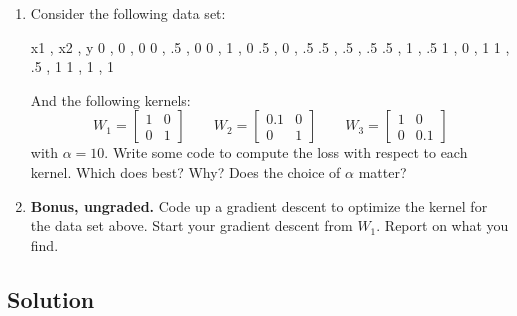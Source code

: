 \documentclass[submit]{harvardml}
\begin{document}
\begin{problem}
\begin{enumerate}
\item Consider the following data set:
\begin{csv}
x1 , x2 , y 
  0 , 0 , 0
  0 , .5 , 0
  0 , 1 , 0 
  .5 , 0 , .5
  .5 , .5 , .5
  .5 , 1 , .5
  1 , 0 , 1
  1 , .5 , 1
  1 , 1 , 1 
\end{csv}
And the following kernels:
\begin{equation*} 
W_1 = \begin{bmatrix}
  1 & 0 \\
  0 & 1 
\end{bmatrix}
\qquad
W_2 = \begin{bmatrix}
  0.1 & 0 \\
  0 & 1 
\end{bmatrix}
\qquad
W_3 = \begin{bmatrix}
  1 & 0 \\
  0 & 0.1 
\end{bmatrix}
\end{equation*} 
with $\alpha = 10$. Write some code to compute the loss with respect
to each kernel.  Which does best?  Why?  Does the choice of $\alpha$
matter? 


\item \textbf{Bonus, ungraded.}  Code up a gradient descent to
  optimize the kernel for the data set above.  Start your gradient
  descent from $W_1$.  Report on what you find.
  
\end{enumerate}

\end{problem}

\subsection*{Solution}





\end{document}
